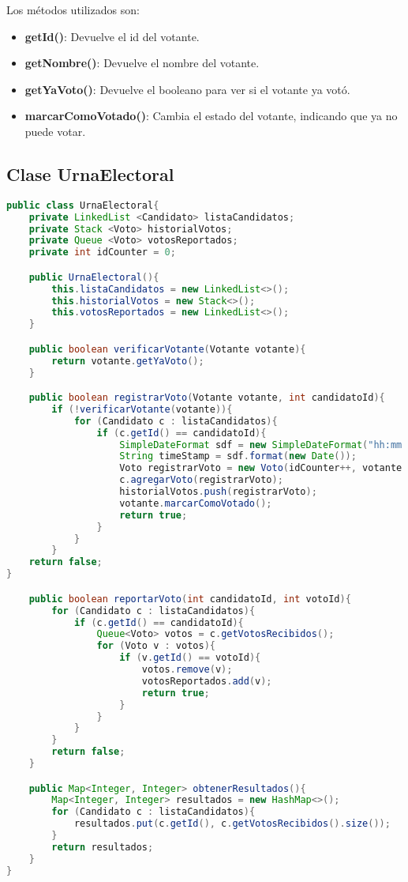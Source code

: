 \documentclass[12pt]{article}
\begin{document}
Los métodos utilizados son: 
\begin{itemize}
    \item \textbf{getId()}: Devuelve el id del votante.
    \item \textbf{getNombre()}: Devuelve el nombre del votante.
    \item \textbf{getYaVoto()}: Devuelve el booleano para ver si el votante ya votó.
    \item \textbf{marcarComoVotado()}: Cambia el estado del votante, indicando que ya no puede votar.
\end{itemize}

\pagebreak

\subsection{Clase UrnaElectoral}
\begin{lstlisting}[language=Java,style=mystyle]
public class UrnaElectoral{
    private LinkedList <Candidato> listaCandidatos;
    private Stack <Voto> historialVotos;
    private Queue <Voto> votosReportados;
    private int idCounter = 0;

    public UrnaElectoral(){
        this.listaCandidatos = new LinkedList<>();
        this.historialVotos = new Stack<>();
        this.votosReportados = new LinkedList<>();
    }

    public boolean verificarVotante(Votante votante){
        return votante.getYaVoto();
    }

    public boolean registrarVoto(Votante votante, int candidatoId){
        if (!verificarVotante(votante)){
            for (Candidato c : listaCandidatos){
                if (c.getId() == candidatoId){
                    SimpleDateFormat sdf = new SimpleDateFormat("hh:mm:ss");
                    String timeStamp = sdf.format(new Date());
                    Voto registrarVoto = new Voto(idCounter++, votante.getId(), candidatoId, timeStamp);
                    c.agregarVoto(registrarVoto);
                    historialVotos.push(registrarVoto);
                    votante.marcarComoVotado();
                    return true;
                }
            }
        }
    return false;
}

    public boolean reportarVoto(int candidatoId, int votoId){
        for (Candidato c : listaCandidatos){
            if (c.getId() == candidatoId){
                Queue<Voto> votos = c.getVotosRecibidos();
                for (Voto v : votos){
                    if (v.getId() == votoId){
                        votos.remove(v);
                        votosReportados.add(v);
                        return true;
                    }
                }
            }
        }
        return false;
    }

    public Map<Integer, Integer> obtenerResultados(){
        Map<Integer, Integer> resultados = new HashMap<>();
        for (Candidato c : listaCandidatos){
            resultados.put(c.getId(), c.getVotosRecibidos().size());
        }
        return resultados;
    }
}


\end{lstlisting}
\pagebreak
\end{document}
